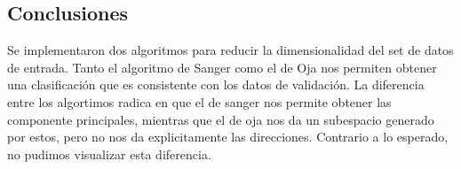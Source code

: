 \subsection{Conclusiones}

\par Se implementaron dos algoritmos para reducir la dimensionalidad del set de datos de entrada. Tanto el algoritmo de Sanger como el de Oja nos permiten obtener una clasificación que es consistente con los datos de validación. La diferencia entre los algortimos radica en que el de sanger nos permite obtener las componente principales, mientras que el de oja nos da un subespacio generado por estos, pero no nos da explicitamente las direcciones. Contrario a lo esperado, no pudimos visualizar esta diferencia. 
